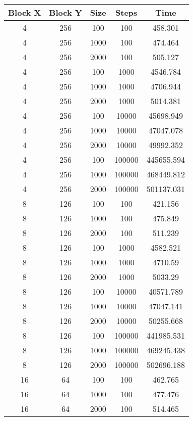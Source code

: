 \documentclass[../main.tex]{subfiles}
\begin{document}
\begin{longtable}{|c|c|c|c|c|}
\hline
Block X & Block Y & Size & Steps  & Time       \\ \hline
\endfirsthead
%
\endhead
%
\hline
\endfoot
%
\endlastfoot
%
4       & 256     & 100  & 100    & 458.301    \\
4       & 256     & 1000 & 100    & 474.464    \\
4       & 256     & 2000 & 100    & 505.127    \\
4       & 256     & 100  & 1000   & 4546.784   \\
4       & 256     & 1000 & 1000   & 4706.944   \\
4       & 256     & 2000 & 1000   & 5014.381   \\
4       & 256     & 100  & 10000  & 45698.949  \\
4       & 256     & 1000 & 10000  & 47047.078  \\
4       & 256     & 2000 & 10000  & 49992.352  \\
4       & 256     & 100  & 100000 & 445655.594 \\
4       & 256     & 1000 & 100000 & 468449.812 \\
4       & 256     & 2000 & 100000 & 501137.031 \\
8       & 126     & 100  & 100    & 421.156    \\
8       & 126     & 1000 & 100    & 475.849    \\
8       & 126     & 2000 & 100    & 511.239    \\
8       & 126     & 100  & 1000   & 4582.521   \\
8       & 126     & 1000 & 1000   & 4710.59    \\
8       & 126     & 2000 & 1000   & 5033.29    \\
8       & 126     & 100  & 10000  & 40571.789  \\
8       & 126     & 1000 & 10000  & 47047.141  \\
8       & 126     & 2000 & 10000  & 50255.668  \\
8       & 126     & 100  & 100000 & 441985.531 \\
8       & 126     & 1000 & 100000 & 469245.438 \\
8       & 126     & 2000 & 100000 & 502696.188 \\
16      & 64      & 100  & 100    & 462.765    \\
16      & 64      & 1000 & 100    & 477.476    \\
16      & 64      & 2000 & 100    & 514.465    \\

\end{longtable}
\end{document}
